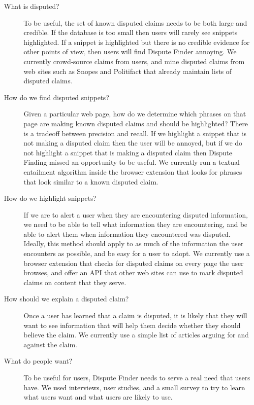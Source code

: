 \documentclass{www2010-submission}
\begin{document}
\begin{description}
\item[What is disputed?] To be useful, the set of known disputed claims needs to be both large and credible. If the database is too small then users will rarely see snippets highlighted. If a snippet is highlighted but there is no credible evidence for other points of view, then users will find Dispute Finder annoying. We currently crowd-source claims from users, and mine disputed claims from web sites such as Snopes and Politifact that already maintain lists of disputed claims.

\item[How do we find disputed snippets?] Given a particular web page, how do we determine which phrases on that page are making known disputed claims and should be highlighted? There is a tradeoff between precision and recall. If we highlight a snippet that is not making a disputed claim then the user will be annoyed, but if we do not highlight a snippet that is making a disputed claim then Dispute Finding missed an opportunity to be useful. We currently run a textual entailment algorithm inside the browser extension that looks for phrases that look similar to a known disputed claim.

\item[How do we highlight snippets?] If we are to alert a user when they are encountering disputed information, we need to be able to tell what information they are encountering, and be able to alert them when information they encountered was disputed. Ideally, this method should apply to as much of the information the user encounters as possible, and be easy for a user to adopt. We currently use a browser extension that checks for disputed claims on every page the user browses, and offer an API that other web sites can use to mark disputed claims on content that they serve.

\item[How should we explain a disputed claim?] Once a user has learned that a claim is disputed, it is likely that they will want to see information that will help them decide whether they should believe the claim. We currently use a simple list of articles arguing for and against the claim.

\item[What do people want?] To be useful for users, Dispute Finder needs to serve a real need that users have. We used interviews, user studies, and a small survey to try to learn what users want and what users are likely to use.
\end{description}
\end{document}
